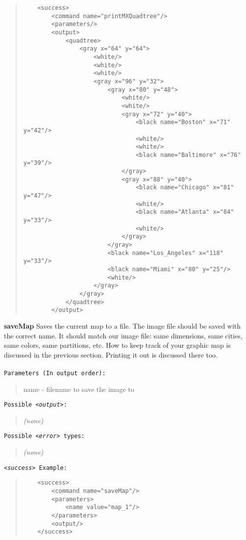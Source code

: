 \documentclass[12pt]{article}
\newenvironment{Description}
   {\begin{list}{}{\let\makelabel\Descriptionlabel
      \setlength\leftmargin{\labelwidth+\labelsep}
      \setlength\itemindent{-0.3em}}}%
   {\end{list}}
\newcommand*{\Descriptionlabel}[1]{%
  \parbox[b]{\labelwidth}
  {\makebox[0pt][l]{\textbf{#1}}\\}
  \hfill}
\begin{document}
\begin{Description}
\begin{Description}
	\begin{quote}
	\begin{verbatim}
	<success>
	    <command name="printMXQuadtree"/>
	    <parameters/>
	    <output>
	        <quadtree>
	            <gray x="64" y="64">
	                <white/>
	                <white/>
	                <white/>
	                <gray x="96" y="32">
	                    <gray x="80" y="48">
	                        <white/>
	                        <white/>
	                        <gray x="72" y="40">
	                            <black name="Boston" x="71" y="42"/>
	                            <white/>
	                            <white/>
	                            <black name="Baltimore" x="76" y="39"/>
	                        </gray>
	                        <gray x="88" y="40">
	                            <black name="Chicago" x="81" y="47"/>
	                            <white/>
	                            <black name="Atlanta" x="84" y="33"/>
	                            <white/>
	                        </gray>
	                    </gray>
	                    <black name="Los_Angeles" x="118" y="33"/>
	                    <black name="Miami" x="80" y="25"/>
	                    <white/>
	                </gray>
	            </gray>
	        </quadtree>
	    </output>
	\end{verbatim}
	\end{quote}


	\item[\textbf{saveMap}] 
	Saves the current map to a file. The image file should be saved with the correct name. It should match our image file: same dimensions, same cities, same colors, same partitions, etc.
	How to keep track of your graphic map is discussed in the previous section. Printing it out is discussed there too. \\\\
  	\texttt{Parameters (In output order):}
	\begin{quote}
		name - filename to save the image to
	\end{quote}
	\texttt{Possible \emph{<output>}:}
	\begin{quote}
		\emph{(none)}
	\end{quote}
   	\texttt{Possible \emph{<error>} types:}
	\begin{quote}
		\emph{(none)}
	\end{quote}
	\texttt{\emph{<success>} Example:}
	\begin{quote}
	\begin{verbatim}
	<success>
	    <command name="saveMap"/>
	    <parameters>
	        <name value="map_1"/>
	    </parameters>
	    <output/>
	</success>
	\end{verbatim}
	\end{quote}




\end{Description}
\end{Description}
\end{document}
